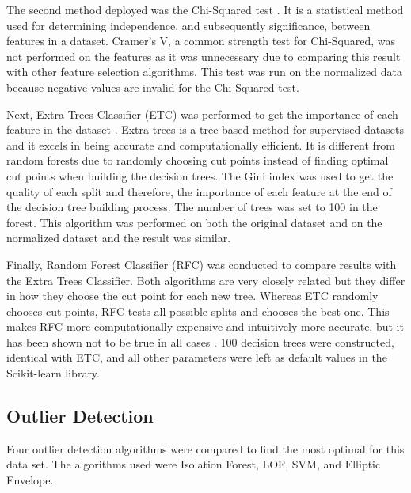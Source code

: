 \documentclass[letterpaper, 12 pt, conference]{ieeeconf}  %
\begin{document}
The second method deployed was the Chi-Squared test \cite{McHugh}. It is a statistical method used for determining independence, and subsequently significance, between features in a dataset. Cramer’s V, a common strength test for Chi-Squared, was not performed on the features as it was unnecessary due to comparing this result with other feature selection algorithms. This test was run on the normalized data because negative values are invalid for the Chi-Squared test.
        
Next, Extra Trees Classifier (ETC) was performed to get the importance of each feature in the dataset \cite{Geurts}. Extra trees is a tree-based method for supervised datasets and it excels in being accurate and computationally efficient. It is different from random forests due to randomly choosing cut points instead of finding optimal cut points when building the decision trees. The Gini index was used to get the quality of each split and therefore, the importance of each feature at the end of the decision tree building process. The number of trees was set to 100 in the forest. This algorithm was performed on both the original dataset and on the normalized dataset and the result was similar.
        
Finally, Random Forest Classifier (RFC) was conducted to compare results with the Extra Trees Classifier. Both algorithms are very closely related but they differ in how they choose the cut point for each new tree. Whereas ETC randomly chooses cut points, RFC tests all possible splits and chooses the best one. This makes RFC more computationally expensive and intuitively more accurate, but it has been shown not to be true in all cases \cite{Geurts}. 100 decision trees were constructed, identical with ETC, and all other parameters were left as default values in the Scikit-learn library.

\subsection{Outlier Detection}

Four outlier detection algorithms were compared to find the most optimal for this data set. The algorithms used were Isolation Forest, LOF, SVM, and Elliptic Envelope.
        
\end{document}
